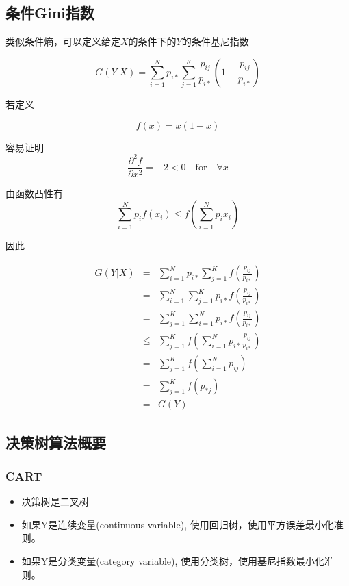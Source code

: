 \subsection{条件Gini指数}

类似条件熵，可以定义给定$X$的条件下的$Y$的条件基尼指数

\begin{equation*}
    G(Y|X) = \sum_{i=1}^Np_{i*}\sum_{j=1}^K\frac{p_{ij}}{p_{i*}}(1 - \frac{p_{ij}}{p_{i*}})
\end{equation*}

若定义

\begin{equation*}
    f(x) = x(1 - x)
\end{equation*}

容易证明
\begin{equation*}
    \frac{\partial^2 f}{\partial x^2} = -2 < 0 \quad \text{for} \quad \forall x
\end{equation*}

由函数凸性有
\begin{equation*}
    \sum_{i=1}^N p_i f(x_i) \leq f(\sum_{i=1}^N p_i x_i)
\end{equation*}

因此

\begin{equation*}
    \begin{array}{rcl}
        G(Y|X) & = & \sum_{i=1}^Np_{i*}\sum_{j=1}^Kf(\frac{p_{ij}}{p_{i*}}) \\
               & = & \sum_{i=1}^N\sum_{j=1}^Kp_{i*}f(\frac{p_{ij}}{p_{i*}}) \\
               & = & \sum_{j=1}^K\sum_{i=1}^Np_{i*}f(\frac{p_{ij}}{p_{i*}}) \\
               & \leq & \sum_{j=1}^Kf(\sum_{i=1}^Np_{i*}\frac{p_{ij}}{p_{i*}}) \\
               & = & \sum_{j=1}^Kf(\sum_{i=1}^Np_{ij}) \\
               & = & \sum_{j=1}^Kf(p_{*j}) \\
               & = & G(Y)

    \end{array}
\end{equation*}

\subsection{决策树算法概要}

\subsubsection{CART}
\begin{itemize}
    \item 决策树是二叉树
    \item 如果Y是连续变量(continuous variable), 使用回归树，使用平方误差最小化准则。
    \item 如果Y是分类变量(category variable), 使用分类树，使用基尼指数最小化准则。
\end{itemize}